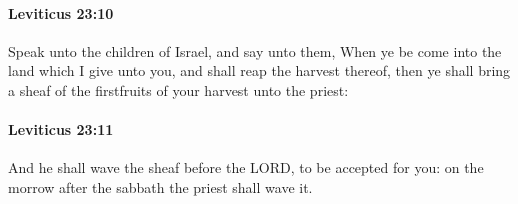 		\paragraph{Leviticus 23:10} %
			\label{LEVITICUS-23-10}

			Speak unto the children of Israel, and say unto them, When ye be come into the land which I give unto you, and shall reap the harvest thereof, then ye shall bring a sheaf of the firstfruits of your harvest unto the priest:


		\paragraph{Leviticus 23:11} %
			\label{LEVITICUS-23-11}

			And he shall wave the sheaf before the LORD, to be accepted for you: on the morrow after the sabbath the priest shall wave it.


